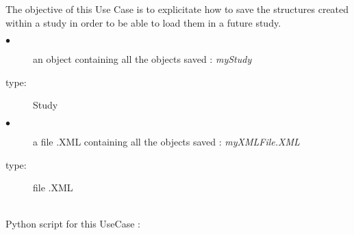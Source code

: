 \renewcommand{\filename}{docUC_LoadSave_Save.tex}
\renewcommand{\filetitle}{UC : How to save a study ?}

\HeaderIILevel

The objective of this Use Case is to explicitate how to save the structures created within a study in order to be able to load them in a future study.\\


{
  \begin{description}
  \item[$\bullet$] an object containing all the objects saved : {\itshape myStudy}
  \item[type:] Study
  \item[$\bullet$]  a file .XML containing all the objects saved : {\itshape myXMLFile.XML}
  \item[type:] file .XML
  \end{description}
}

\textspace\\
Python  script for this UseCase :

